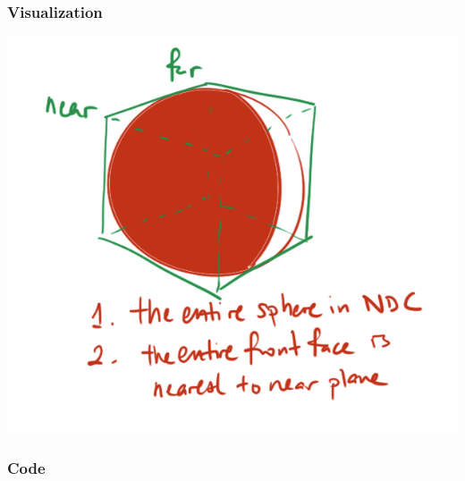 \documentclass{beamer}
\begin{document}
\begin{frame}
    \frametitle{Visualization}

    \includegraphics[scale=0.5]{images/q7-vis.png}

\end{frame}

\begin{frame}
    \frametitle{Code}

    

\end{frame}
\end{document}

